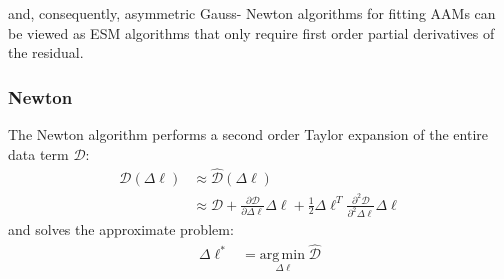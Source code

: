 and, consequently, asymmetric Gauss- Newton algorithms for fitting AAMs can be viewed as ESM algorithms that only require first order partial derivatives of the residual.


\subsubsection{Newton}
\label{sec:newton}

The Newton algorithm performs a second order Taylor expansion of the entire data term $\mathcal{D}$:
\begin{equation}
    \begin{aligned}
		\mathcal{D}(\Delta \boldsymbol{\ell}) & \approx \hat{\mathcal{D}}(\Delta \boldsymbol{\ell})
		\\
		& \approx \mathcal{D} + \frac{\partial \mathcal{D}}{\partial \Delta \boldsymbol{\ell}} \Delta \boldsymbol{\ell} + \frac{1}{2}\Delta \boldsymbol{\ell}^T \frac{\partial^2 \mathcal{D}}{\partial^2 \Delta \boldsymbol{\ell}} \Delta \boldsymbol{\ell}
    \label{eq:newton_taylor}
    \end{aligned}
\end{equation}
and solves the approximate problem:
\begin{equation}
    \begin{aligned}
        \Delta \boldsymbol{\ell}^* & = \underset{\Delta \boldsymbol{\ell}}{\mathrm{arg\,min\;}} \hat{\mathcal{D}}
    \label{eq:newton_optimization_problem}
    \end{aligned}
\end{equation}

